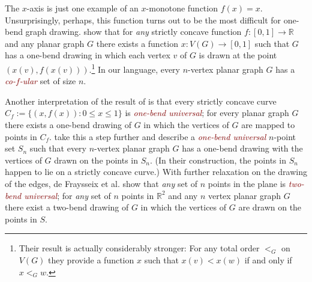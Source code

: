 \documentclass{article}
\newcommand{\R}{\mathbb{R}}
\newcommand{\defin}[1]{\emph{\textcolor{Maroon}{#1}}}
\theoremstyle{definition}
\begin{document}
The $x$-axis is just one example of an $x$-monotone function $f(x)=x$. Unsurprisingly, perhaps, this function turns out to be the most difficult for one-bend graph drawing.
\citet{DBLP:journals/comgeo/GiacomoDLW05} show that for \emph{any} strictly concave function $f:[0,1]\to\R$ and any planar graph $G$ there exists a function $x:V(G)\to[0,1]$ such that $G$
has a one-bend drawing in which each vertex $v$ of $G$ is drawn at the point $(x(v),f(x(v)))$.\footnote{Their result is actually considerably stronger: For any total order $<_G$ on $V(G)$ they provide a function $x$ such that $x(v) < x(w)$ if and only if $x<_G w$.}
  In our language, every $n$-vertex planar graph $G$ has a \defin{co-$f$-ular} set of size $n$.


Another interpretation of the result of \citet{DBLP:journals/comgeo/GiacomoDLW05} is that every strictly concave curve $C_f:=\{(x,f(x)):0\le x\le 1\}$ is \defin{one-bend universal}; for every planar graph $G$ there exists a one-bend drawing of $G$ in which the vertices of $G$ are mapped to points in $C_f$. \citet{DBLP:conf/gd/EverettLLW07} take this a step further and describe a \defin{one-bend universal} $n$-point set $S_n$ such that every $n$-vertex planar graph $G$ has a one-bend drawing with the vertices of $G$ drawn on the points in $S_n$. (In their construction, the points in $S_n$ happen to lie on a strictly concave curve.)
With further relaxation on the drawing of the edges, de Fraysseix et al. \cite{DBLP:journals/combinatorica/FraysseixPP90} show that \emph{any} set of $n$ points in the plane is \defin{two-bend universal}; for \emph{any} set of $n$ points in $\R^2$ and any $n$ vertex planar graph $G$ there exist a two-bend drawing of $G$ in which the vertices of $G$ are drawn on the points in $S$.
\end{document}
